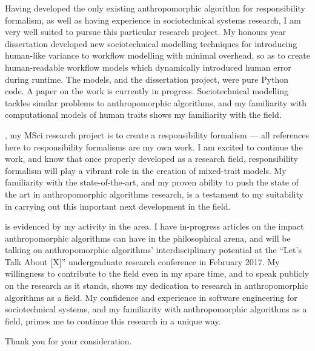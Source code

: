 Having developed the only existing anthropomorphic algorithm for responsibility formalism, as well as having experience in sociotechnical systems research, I am very well suited to pursue this particular research project. My honours year dissertation developed new sociotechnical modelling techniques for introducing human-like variance to workflow modelling with minimal overhead, so as to create human-readable workflow models which dynamically introduced human error during runtime. The models, and the dissertation project, were pure Python code. A paper on the work is currently in progress.\cite{wallis_2016_b} Sociotechnical modelling tackles similar problems to anthropomorphic algorithms, and my familiarity with computational models of human traits shows my familiarity with the field.\par

, my MSci research project is to create a responsibility formalism --- all references here to responsibility formalisms are my own work. I am excited to continue the work, and know that once properly developed as a research field, responsibility formalism will play a vibrant role in the creation of mixed-trait models. My familiarity with the state-of-the-art, and my proven ability to push the state of the art in anthropomorphic algorithms research, is a testament to my suitability in carrying out this important next development in the field.\par

 is evidenced by my activity in the area. I have in-progress articles on the impact anthropomorphic algorithms can have in the philosophical arena, and will be talking on anthropomorphic algorithms' interdisciplinary potential at the ``Let's Talk About [X]'' undergraduate research conference in February 2017. My willingness to contribute to the field even in my spare time, and to speak publicly on the research as it stands, shows my dedication to research in anthropomorphic algorithms as a field. My confidence and experience in software engineering for sociotechnical systems, and my familiarity with anthropomorphic algorithms as a field, primes me to continue this research in a unique way.\par

\bigskip

Thank you for your consideration.\par




